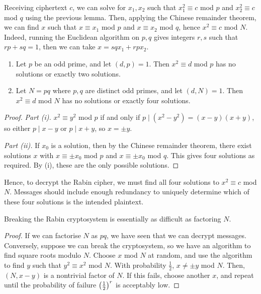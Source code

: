 Receiving ciphertext \( c \), we can solve for \( x_1, x_2 \) such that \( x_1^2 \equiv c \) mod \( p \) and \( x_2^2 \equiv c \) mod \( q \) using the previous lemma.
Then, applying the Chinese remainder theorem, we can find \( x \) such that \( x \equiv x_1 \) mod \( p \) and \( x \equiv x_2 \) mod \( q \), hence \( x^2 \equiv c \) mod \( N \).
Indeed, running the Euclidean algorithm on \( p, q \) gives integers \( r, s \) such that \( rp + sq = 1 \), then we can take \( x = sqx_1 + rpx_2 \).
\begin{lemma}
    \begin{enumerate}
        \item Let \( p \) be an odd prime, and let \( (d, p) = 1 \).
        Then \( x^2 \equiv d \) mod \( p \) has no solutions or exactly two solutions.
        \item Let \( N = pq \) where \( p, q \) are distinct odd primes, and let \( (d, N) = 1 \).
        Then \( x^2 \equiv d \) mod \( N \) has no solutions or exactly four solutions.
    \end{enumerate}
\end{lemma}
\begin{proof}
    \emph{Part (i).}
    \( x^2 \equiv y^2 \) mod \( p \) if and only if \( p \mid (x^2 - y^2) = (x-y)(x+y) \), so either \( p \mid x-y \) or \( p \mid x+y \), so \( x = \pm y \).

    \emph{Part (ii).}
    If \( x_0 \) is a solution, then by the Chinese remainder theorem, there exist solutions \( x \) with \( x \equiv \pm x_0 \) mod \( p \) and \( x \equiv \pm x_0 \) mod \( q \).
    This gives four solutions as required.
    By (i), these are the only possible solutions.
\end{proof}
Hence, to decrypt the Rabin cipher, we must find all four solutions to \( x^2 \equiv c \) mod \( N \).
Messages should include enough redundancy to uniquely determine which of these four solutions is the intended plaintext.
\begin{theorem}
    Breaking the Rabin cryptosystem is essentially as difficult as factoring \( N \).
\end{theorem}
\begin{proof}
    If we can factorise \( N \) as \( pq \), we have seen that we can decrypt messages.
    Conversely, suppose we can break the cryptosystem, so we have an algorithm to find square roots modulo \( N \).
    Choose \( x \) mod \( N \) at random, and use the algorithm to find \( y \) such that \( y^2 \equiv x^2 \) mod \( N \).
    With probability \( \frac{1}{2} \), \( x \neq \pm y \) mod \( N \).
    Then, \( (N, x-y) \) is a nontrivial factor of \( N \).
    If this fails, choose another \( x \), and repeat until the probability of failure \( \qty(\frac{1}{2})^r \) is acceptably low.
\end{proof}


